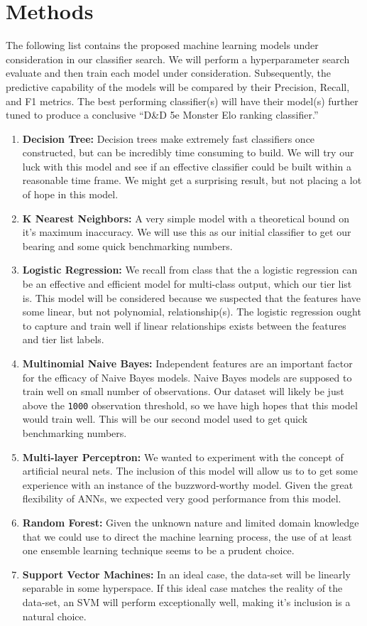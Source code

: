 \documentclass{article}
\newcommand{\DnD}{D\&D 5e\xspace}
\begin{document}
\section{Methods}

The following list contains the proposed machine learning models under consideration in our classifier search.
We will perform a hyperparameter search evaluate and then train each model under consideration.
Subsequently, the predictive capability of the models will be compared by their Precision, Recall, and F1 metrics.
The best performing classifier(s) will have their model(s) further tuned to produce a conclusive ``\DnD Monster Elo ranking classifier.''

\begin{enumerate}
	\def\labelenumi{\arabic{enumi}.}
	\item
	\textbf{Decision Tree:} Decision trees make extremely fast classifiers once constructed, but can be incredibly time consuming to build.
	We will try our luck with this model and see if an effective classifier could be built within a reasonable time frame.
	We might get a surprising result, but not placing a lot of hope in this model.
	\item
	\textbf{K Nearest Neighbors:} A very simple model with a theoretical bound on it's maximum inaccuracy.
	We will use this as our initial classifier to get our bearing and some quick benchmarking numbers.
	\item
	\textbf{Logistic Regression:} We recall from class that the a logistic regression
	can be an effective and efficient model for multi-class output, which
	our tier list is.
	This model will be considered because we suspected that the features have some linear, but not polynomial, relationship(s).
	The	logistic regression ought to capture and train well if linear relationships exists between the features and tier list labels.
	\item
	\textbf{Multinomial Naive Bayes:} Independent features are an important factor for the efficacy of Naive Bayes models.
	Naive Bayes models are supposed to train well on small number of observations.
	Our dataset will likely be just above the \texttt{1000} observation threshold, so we have high hopes that this model would train well.
	This will be our second model used to get quick benchmarking numbers.
	\item
	\textbf{Multi-layer Perceptron:} We wanted to experiment with the
	concept of artificial neural nets.
	The inclusion of this model will allow us to to get some experience with an instance of the buzzword-worthy model.
	Given the great flexibility of ANNs, we expected very good performance from this model.
	\item
	\textbf{Random Forest:} Given the unknown nature and limited domain knowledge that we could use to direct the machine learning process, the use of at least one ensemble learning technique seems to be a prudent choice.
	\item
	\textbf{Support Vector Machines:} In an ideal case, the data-set will be linearly separable in some hyperspace.
	If this ideal case matches the reality of the data-set, an SVM will perform exceptionally well, making it's inclusion is a natural choice.
\end{enumerate}

\newpage
\medskip
\small
%
\end{document}
